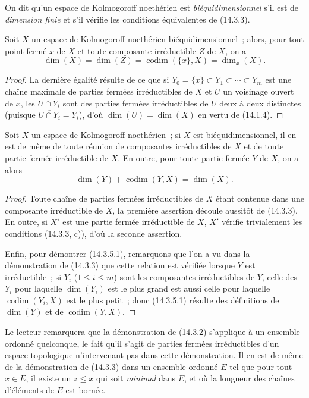 On dit qu'un espace de Kolmogoroff noethérien est \emph{biéquidimensionnel}
s'il est de \emph{dimension finie} et s'il vérifie les conditions équivalentes
de (14.3.3).

\begin{corollary}[14.3.4]
\label{0.14.3.4-fr}
Soit $X$ un espace de Kolmogoroff noethérien biéquidimensionnel~; alors, pour
tout point fermé $x$ de $X$ et toute composante irréductible $Z$ de $X$, on a
\[
  \dim(X)=\dim(Z)=\operatorname{codim}(\{x\},X)=\dim_x(X).
  \tag{14.3.4.1}\label{0.14.3.4.1-fr}
\]
\end{corollary}

\begin{proof}
La dernière égalité résulte de ce que si
$Y_0=\{x\}\subset Y_1\subset\cdots\subset Y_m$ est une chaîne maximale de
parties fermées irréductibles de $X$ et $U$ un voisinage ouvert de $x$, les
$U\cap Y_i$ sont des parties fermées irréductibles de $U$ deux à deux
distinctes (puisque $\overline{U\cap Y_i}=Y_i$), d'où
$\dim(U)=\dim(X)$ en vertu de (14.1.4).
\end{proof}

\begin{corollary}[14.3.5]
\label{0.14.3.5-fr}
Soit $X$ un espace de Kolmogoroff noethérien~; si $X$ est
biéquidimensionnel, il en est de même de toute réunion de composantes
irréductibles de $X$ et de toute partie fermée irréductible de $X$. En outre,
pour toute partie fermée $Y$ de $X$, on a alors
\[
  \dim(Y)+\operatorname{codim}(Y,X)=\dim(X).
  \tag{14.3.5.1}\label{0.14.3.5.1-fr}
\]
\end{corollary}

\begin{proof}
Toute chaîne de parties fermées irréductibles de $X$ étant contenue dans une
composante irréductible de $X$, la première assertion découle aussitôt de
(14.3.3). En outre, si $X'$ est une partie fermée irréductible de $X$, $X'$
vérifie trivialement les conditions (14.3.3, c)), d'où la seconde assertion.

Enfin, pour démontrer (14.3.5.1), remarquons que l'on a vu dans la
démonstration de (14.3.3) que cette relation est vérifiée lorsque $Y$ est
irréductible~; si $Y_i$ ($1\leq i\leq m$) sont les composantes irréductibles
de $Y$, celle des $Y_i$ pour laquelle $\dim(Y_i)$ est le plus grand est aussi
celle pour laquelle $\operatorname{codim}(Y_i,X)$ est le plus petit~; donc
(14.3.5.1) résulte des définitions de $\dim(Y)$ et de
$\operatorname{codim}(Y,X)$.
\end{proof}

\begin{remark}[14.3.6]
\label{0.14.3.6-fr}
Le lecteur remarquera que la démonstration de (14.3.2) s'applique à un
ensemble ordonné quelconque, le fait qu'il s'agit de parties fermées
irréductibles d'un espace topologique n'intervenant pas dans cette
démonstration. Il en est de même de la démonstration de (14.3.3) dans un
ensemble ordonné $E$ tel que pour tout $x\in E$, il existe un $z\leq x$ qui
soit \emph{minimal} dans $E$, et où la longueur des chaînes d'éléments de $E$
est bornée.
\end{remark}
